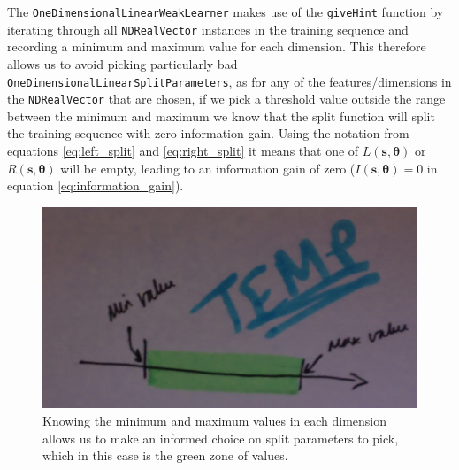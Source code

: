 \documentclass[12pt,twoside,notitlepage]{report}
\newcommand{\vc}[1]{\mathbf{#1}}
\begin{document}
                The \texttt{OneDimensionalLinearWeakLearner} makes use of the \texttt{giveHint} function by iterating through 
                all \texttt{NDRealVector} instances in the training sequence and recording a minimum and maximum value 
                for each dimension. This therefore allows us to avoid picking particularly bad 
                \texttt{OneDimensionalLinearSplitParameters}, as for any of the features/dimensions in the \texttt{NDRealVector} 
                that are chosen, if we pick a threshold value outside the range between the minimum and maximum we know that 
                the split function will split the training sequence with zero information gain. Using the notation from 
                equations \ref{eq:left_split} and \ref{eq:right_split} it means that one of $L(\vc{s},\vc{\theta})$ or 
                $R(\vc{s},\vc{\theta})$ will be empty, leading to an information gain of zero ($I(\vc{s},\vc{\theta}) = 0$ 
                in equation \ref{eq:information_gain}).

                \begin{figure}[H]
                  \centering
                  \includegraphics[scale=0.25]{one_dimensional_weak_learner_optimisation.jpeg}
                  \caption{Knowing the minimum and maximum values in each dimension allows us to make an informed 
                  choice on split parameters to pick, which in this case is the green zone of values.}
                \end{figure}
\end{document}
